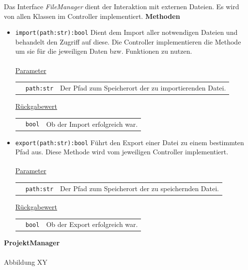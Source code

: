 \documentclass{article}
\begin{document}
Das Interface \textit{FileManager} dient der Interaktion mit externen Dateien. Es wird von allen Klassen im Controller implementiert.
\newline \newline
\textbf{{Methoden}}
\begin{itemize}
\item \texttt{import(path:str):bool} \newline Dient dem Import aller notwendigen Dateien und behandelt den Zugriff auf diese. Die Controller implementieren die Methode um sie für die jeweiligen Daten bzw. Funktionen zu nutzen.
\\\\
\underline{{Parameter}}

\begin{tabular}{lll}
 & \texttt{path:str} & Der Pfad zum Speicherort der zu importierenden Datei. \\
\end{tabular}

\underline{{Rückgabewert}}

\begin{tabular}{lll}
 & \texttt{bool} & Ob der Import erfolgreich war. \\
\end{tabular}


\item \texttt{export(path:str):bool} \newline Führt den Export einer Datei zu einem bestimmten Pfad aus. Diese Methode wird vom jeweiligen Controller implementiert.
\\\\
\underline{{Parameter}}

\begin{tabular}{lll}
 & \texttt{path:str} & Der Pfad zum Speicherort der zu speichernden Datei. \\
\end{tabular}

\underline{{Rückgabewert}}

\begin{tabular}{lll}
 & \texttt{bool} & Ob der Export erfolgreich war. \\
\end{tabular}
\end{itemize}

\newpage
\textbf{\large{ProjektManager}}\\\\
Abbildung XY
\end{document}
